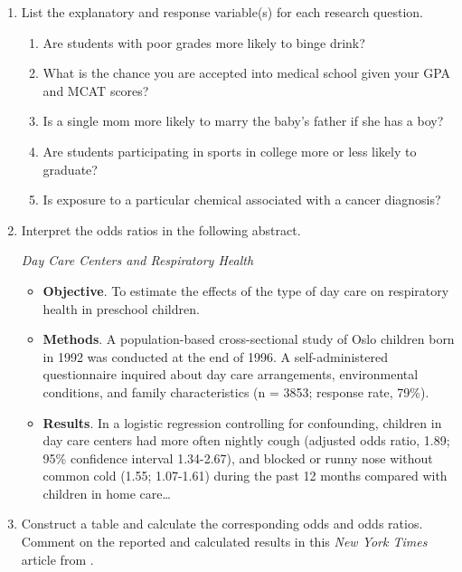 \documentclass[
]{krantz}
\providecommand{\tightlist}{%
  \setlength{\itemsep}{0pt}\setlength{\parskip}{0pt}}
\begin{document}
\begin{enumerate}
\def\labelenumi{\arabic{enumi}.}
\item
  List the explanatory and response variable(s) for each research question.

  \begin{enumerate}
  \def\labelenumii{\alph{enumii}.}
  \tightlist
  \item
    Are students with poor grades more likely to binge drink?
  \item
    What is the chance you are accepted into medical school given your GPA and MCAT scores?
  \item
    Is a single mom more likely to marry the baby's father if she has a boy?
  \item
    Are students participating in sports in college more or less likely to graduate?
  \item
    Is exposure to a particular chemical associated with a cancer diagnosis?
  \end{enumerate}
\item
  Interpret the odds ratios in the following abstract.

  \emph{Day Care Centers and Respiratory Health} \citep{Nafstad1999}

  \begin{itemize}
  \item
    \textbf{Objective}. To estimate the effects of the type of day care on respiratory health in preschool children.
  \item
    \textbf{Methods}. A population-based cross-sectional study of Oslo children born in 1992 was conducted at the end of 1996. A self-administered questionnaire inquired about day care arrangements, environmental conditions, and family characteristics (n = 3853; response rate, 79\%).
  \item
    \textbf{Results}. In a logistic regression controlling for confounding, children in day care centers had more often nightly cough (adjusted odds ratio, 1.89; 95\% confidence interval 1.34-2.67), and blocked or runny nose without common cold (1.55; 1.07-1.61) during the past 12 months compared with children in home care\ldots{}
  \end{itemize}
\item
  Construct a table and calculate the corresponding odds and odds ratios. Comment on the reported and calculated results in this \emph{New York Times} article from \citet{Kolata2009}.


\end{enumerate}
\end{document}
